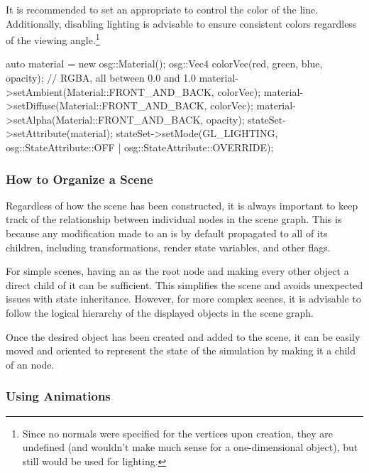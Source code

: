 It is recommended to set an appropriate  to control the
color of the line. Additionally, disabling lighting is advisable to ensure
consistent colors regardless of the viewing angle.\footnote{Since no normals
were specified for the vertices upon creation, they are undefined
(and wouldn't make much sense for a one-dimensional object),
but still would be used for lighting.}

\begin{cpp}
auto material = new osg::Material();
osg::Vec4 colorVec(red, green, blue, opacity); // RGBA, all between 0.0 and 1.0
material->setAmbient(Material::FRONT_AND_BACK, colorVec);
material->setDiffuse(Material::FRONT_AND_BACK, colorVec);
material->setAlpha(Material::FRONT_AND_BACK, opacity);
stateSet->setAttribute(material);
stateSet->setMode(GL_LIGHTING,
            osg::StateAttribute::OFF | osg::StateAttribute::OVERRIDE);
\end{cpp}

\subsubsection{How to Organize a Scene}
\label{sec:graphics:osg-organizing-a-scene}

Regardless of how the scene has been constructed, it is always important to keep
track of the relationship between individual nodes in the scene graph. This is
because any modification made to an  is by default propagated
to all of its children, including transformations, render state variables, and
other flags.

For simple scenes, having an  as the root node and making
every other object a direct child of it can be sufficient. This simplifies the
scene and avoids unexpected issues with state inheritance. However, for more
complex scenes, it is advisable to follow the logical hierarchy of the displayed
objects in the scene graph.

Once the desired object has been created and added to the scene, it can be
easily moved and oriented to represent the state of the simulation by making it
a child of an  node.

\subsubsection{Using Animations}
\label{sec:graphics:osg-using-animations}


